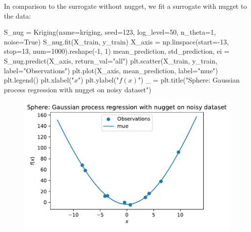 \documentclass[
  letterpaper,
  DIV=11,
  numbers=noendperiod]{scrreprt}
\newenvironment{Shaded}{\begin{snugshade}}{\end{snugshade}}
\newcommand{\DecValTok}[1]{\textcolor[rgb]{0.68,0.00,0.00}{#1}}
\newcommand{\NormalTok}[1]{\textcolor[rgb]{0.00,0.23,0.31}{#1}}
\newcommand{\OperatorTok}[1]{\textcolor[rgb]{0.37,0.37,0.37}{#1}}
\newcommand{\StringTok}[1]{\textcolor[rgb]{0.13,0.47,0.30}{#1}}
\newcommand{\VariableTok}[1]{\textcolor[rgb]{0.07,0.07,0.07}{#1}}
\begin{document}
In comparison to the surrogate without nugget, we fit a surrogate with
nugget to the data:

\begin{Shaded}
\begin{Highlighting}[]
\NormalTok{S\_nug }\OperatorTok{=}\NormalTok{ Kriging(name}\OperatorTok{=}\StringTok{\textquotesingle{}kriging\textquotesingle{}}\NormalTok{,}
\NormalTok{            seed}\OperatorTok{=}\DecValTok{123}\NormalTok{,}
\NormalTok{            log\_level}\OperatorTok{=}\DecValTok{50}\NormalTok{,}
\NormalTok{            n\_theta}\OperatorTok{=}\DecValTok{1}\NormalTok{,}
\NormalTok{            noise}\OperatorTok{=}\VariableTok{True}\NormalTok{)}
\NormalTok{S\_nug.fit(X\_train, y\_train)}
\NormalTok{X\_axis }\OperatorTok{=}\NormalTok{ np.linspace(start}\OperatorTok{={-}}\DecValTok{13}\NormalTok{, stop}\OperatorTok{=}\DecValTok{13}\NormalTok{, num}\OperatorTok{=}\DecValTok{1000}\NormalTok{).reshape(}\OperatorTok{{-}}\DecValTok{1}\NormalTok{, }\DecValTok{1}\NormalTok{)}
\NormalTok{mean\_prediction, std\_prediction, ei }\OperatorTok{=}\NormalTok{ S\_nug.predict(X\_axis, return\_val}\OperatorTok{=}\StringTok{"all"}\NormalTok{)}
\NormalTok{plt.scatter(X\_train, y\_train, label}\OperatorTok{=}\StringTok{"Observations"}\NormalTok{)}
\NormalTok{plt.plot(X\_axis, mean\_prediction, label}\OperatorTok{=}\StringTok{"mue"}\NormalTok{)}
\NormalTok{plt.legend()}
\NormalTok{plt.xlabel(}\StringTok{"$x$"}\NormalTok{)}
\NormalTok{plt.ylabel(}\StringTok{"$f(x)$"}\NormalTok{)}
\NormalTok{\_ }\OperatorTok{=}\NormalTok{ plt.title(}\StringTok{"Sphere: Gaussian process regression with nugget on noisy dataset"}\NormalTok{)}
\end{Highlighting}
\end{Shaded}

\begin{figure}[H]

{\centering \includegraphics{09_spot_ocba_files/figure-pdf/cell-11-output-1.pdf}

}

\end{figure}
\end{document}
